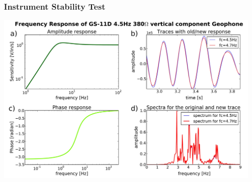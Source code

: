 \documentclass[compress=false,usepdftitle=false, subsection=false,xcolor=dvipsnames]{beamer}
\begin{document}
\begin{frame}
	\frametitle{Instrument Stability Test}
	\begin{center}
		\includegraphics[width=.85\linewidth]{Figures/freq_resp2.JPEG}
    \end{center}
\end{frame}
%
\end{document}
